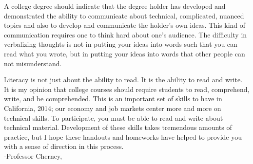 \documentclass[12pt]{article}
\begin{document}
A college degree should indicate that the degree holder has developed and demonstrated the ability to communicate about technical, complicated, nuanced topics and also to develop and communicate the holder's own ideas. 
This kind of communication requires one to think hard about one's audience. The difficulty in verbalizing thoughts is not in putting your ideas into words such that you can read what you wrote, but in putting your ideas into words that other people can not misunderstand. 

Literacy is not just about the ability to read. It is the ability to read and write. 
It is my opinion that college courses should require students to read, comprehend, write, and be comprehended. This is an important set of skills to have in California, 2014; 
our economy and job markets center more and more on technical skills. 
To participate, you must be able to read and write about technical material. 
Development of these skills takes tremendous amounts of practice, but I hope these handouts and homeworks have helped to provide you with a sense of direction in this process. 
\\


-Professor Cherney, \\




%
%



%



\end{document}

